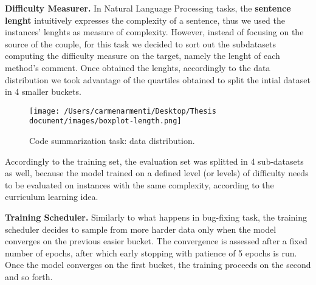 \noindent\textbf{Difficulty Measurer.} In Natural Language Processing tasks, the \textbf{sentence lenght} intuitively expresses the complexity 
of a sentence, thus we used the instances' lenghts as measure of complexity. 
However, instead of focusing on the source of the couple, for this task we decided to sort out the subdatasets computing the
difficulty measure on the target, namely the lenght of each method's comment. 
Once obtained the lenghts, accordingly to the data distribution we took advantage of the quartiles obtained to split the intial dataset in 4 smaller 
buckets. 
\begin{figure}[h!]
    \begin{center}
        \texttt{[image: /Users/carmenarmenti/Desktop/Thesis document/images/boxplot-length.png]}
        \caption{\label{fig:CSdistribution}Code summarization task: data distribution.}
    \end{center}
\end{figure}
Accordingly to the training set, the evaluation set was splitted in 4 sub-datasets as well, because the model trained on a defined level (or levels) of difficulty
needs to be evaluated on instances with the same complexity, according to the curriculum learning idea.\newline

\noindent\textbf{Training Scheduler.} Similarly to what happens in bug-fixing task, the training scheduler decides to sample from more harder data only when the model converges on the 
previous easier bucket. The convergence is assessed after a fixed number of epochs, after which early stopping with patience of 5 epochs
is run. Once the model converges on the first bucket, the training proceeds on the second and so forth. 



